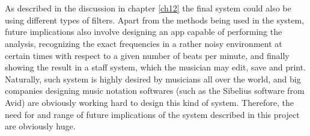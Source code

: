 
\\ \\
As described in the discussion in chapter \ref{ch12} the final system could also be using different types of filters. Apart from the methods being used in the system, future implications also involve designing an app capable of performing the analysis, recognizing the exact frequencies in a rather noisy environment at certain times with respect to a given number of beats per minute, and finally showing the result in a staff system, which the musician may edit, save and print. Naturally, such system is highly desired by musicians all over the world, and big companies designing music notation softwares (such as the Sibelius software from Avid) are obviously working hard to design this kind of system. Therefore, the need for and range of future implications of the system described in this project are obviously huge.